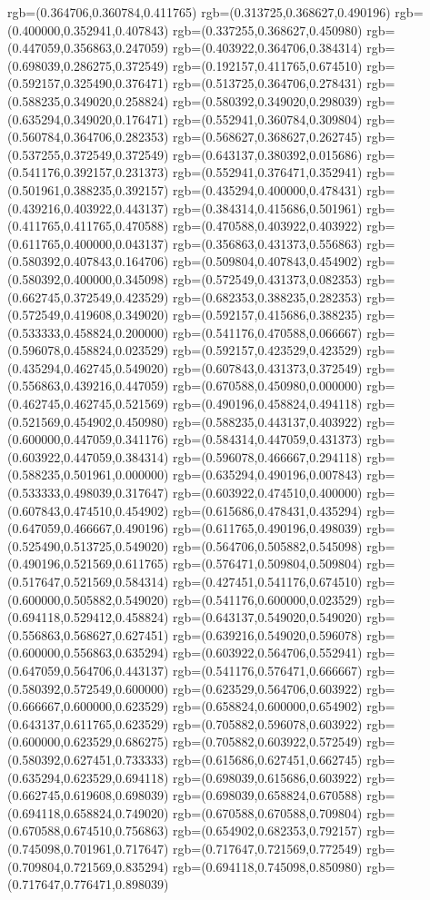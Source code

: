 {{rgb=(0.364706,0.360784,0.411765)
rgb=(0.313725,0.368627,0.490196)
rgb=(0.400000,0.352941,0.407843)
rgb=(0.337255,0.368627,0.450980)
rgb=(0.447059,0.356863,0.247059)
rgb=(0.403922,0.364706,0.384314)
rgb=(0.698039,0.286275,0.372549)
rgb=(0.192157,0.411765,0.674510)
rgb=(0.592157,0.325490,0.376471)
rgb=(0.513725,0.364706,0.278431)
rgb=(0.588235,0.349020,0.258824)
rgb=(0.580392,0.349020,0.298039)
rgb=(0.635294,0.349020,0.176471)
rgb=(0.552941,0.360784,0.309804)
rgb=(0.560784,0.364706,0.282353)
rgb=(0.568627,0.368627,0.262745)
rgb=(0.537255,0.372549,0.372549)
rgb=(0.643137,0.380392,0.015686)
rgb=(0.541176,0.392157,0.231373)
rgb=(0.552941,0.376471,0.352941)
rgb=(0.501961,0.388235,0.392157)
rgb=(0.435294,0.400000,0.478431)
rgb=(0.439216,0.403922,0.443137)
rgb=(0.384314,0.415686,0.501961)
rgb=(0.411765,0.411765,0.470588)
rgb=(0.470588,0.403922,0.403922)
rgb=(0.611765,0.400000,0.043137)
rgb=(0.356863,0.431373,0.556863)
rgb=(0.580392,0.407843,0.164706)
rgb=(0.509804,0.407843,0.454902)
rgb=(0.580392,0.400000,0.345098)
rgb=(0.572549,0.431373,0.082353)
rgb=(0.662745,0.372549,0.423529)
rgb=(0.682353,0.388235,0.282353)
rgb=(0.572549,0.419608,0.349020)
rgb=(0.592157,0.415686,0.388235)
rgb=(0.533333,0.458824,0.200000)
rgb=(0.541176,0.470588,0.066667)
rgb=(0.596078,0.458824,0.023529)
rgb=(0.592157,0.423529,0.423529)
rgb=(0.435294,0.462745,0.549020)
rgb=(0.607843,0.431373,0.372549)
rgb=(0.556863,0.439216,0.447059)
rgb=(0.670588,0.450980,0.000000)
rgb=(0.462745,0.462745,0.521569)
rgb=(0.490196,0.458824,0.494118)
rgb=(0.521569,0.454902,0.450980)
rgb=(0.588235,0.443137,0.403922)
rgb=(0.600000,0.447059,0.341176)
rgb=(0.584314,0.447059,0.431373)
rgb=(0.603922,0.447059,0.384314)
rgb=(0.596078,0.466667,0.294118)
rgb=(0.588235,0.501961,0.000000)
rgb=(0.635294,0.490196,0.007843)
rgb=(0.533333,0.498039,0.317647)
rgb=(0.603922,0.474510,0.400000)
rgb=(0.607843,0.474510,0.454902)
rgb=(0.615686,0.478431,0.435294)
rgb=(0.647059,0.466667,0.490196)
rgb=(0.611765,0.490196,0.498039)
rgb=(0.525490,0.513725,0.549020)
rgb=(0.564706,0.505882,0.545098)
rgb=(0.490196,0.521569,0.611765)
rgb=(0.576471,0.509804,0.509804)
rgb=(0.517647,0.521569,0.584314)
rgb=(0.427451,0.541176,0.674510)
rgb=(0.600000,0.505882,0.549020)
rgb=(0.541176,0.600000,0.023529)
rgb=(0.694118,0.529412,0.458824)
rgb=(0.643137,0.549020,0.549020)
rgb=(0.556863,0.568627,0.627451)
rgb=(0.639216,0.549020,0.596078)
rgb=(0.600000,0.556863,0.635294)
rgb=(0.603922,0.564706,0.552941)
rgb=(0.647059,0.564706,0.443137)
rgb=(0.541176,0.576471,0.666667)
rgb=(0.580392,0.572549,0.600000)
rgb=(0.623529,0.564706,0.603922)
rgb=(0.666667,0.600000,0.623529)
rgb=(0.658824,0.600000,0.654902)
rgb=(0.643137,0.611765,0.623529)
rgb=(0.705882,0.596078,0.603922)
rgb=(0.600000,0.623529,0.686275)
rgb=(0.705882,0.603922,0.572549)
rgb=(0.580392,0.627451,0.733333)
rgb=(0.615686,0.627451,0.662745)
rgb=(0.635294,0.623529,0.694118)
rgb=(0.698039,0.615686,0.603922)
rgb=(0.662745,0.619608,0.698039)
rgb=(0.698039,0.658824,0.670588)
rgb=(0.694118,0.658824,0.749020)
rgb=(0.670588,0.670588,0.709804)
rgb=(0.670588,0.674510,0.756863)
rgb=(0.654902,0.682353,0.792157)
rgb=(0.745098,0.701961,0.717647)
rgb=(0.717647,0.721569,0.772549)
rgb=(0.709804,0.721569,0.835294)
rgb=(0.694118,0.745098,0.850980)
rgb=(0.717647,0.776471,0.898039)
}}
